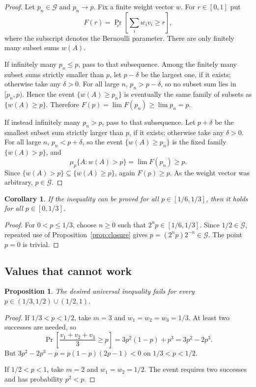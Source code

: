 \documentclass[12pt]{article}
\newtheorem{proposition}{Proposition}
\newtheorem{corollary}{Corollary}
\begin{document}
\begin{proof}
Let \(p_n\in\mathcal G\) and \(p_n\to p\).  Fix a finite weight vector \(w\).
For \(r\in[0,1]\) put
\[
        F(r)=\Pr_r\!\left[\sum_i w_i v_i\ge r\right],
\]
where the subscript denotes the Bernoulli parameter.  There are only finitely
many subset sums \(w(A)\).

If infinitely many \(p_n\le p\), pass to that subsequence.  Among the finitely
many subset sums strictly smaller than \(p\), let \(p-\delta\) be the largest
one, if it exists; otherwise take any \(\delta>0\).  For all large \(n\),
\(p_n>p-\delta\), so no subset sum lies in \([p_n,p)\).  Hence the
event \(\{w(A)\ge p_n\}\) is eventually the same family of subsets as
\(\{w(A)\ge p\}\).  Therefore \(F(p)=\lim F(p_n)\ge\lim p_n=p\).

If instead infinitely many \(p_n>p\), pass to that subsequence.  Let \(p+\delta\)
be the smallest subset sum strictly larger than \(p\), if it exists; otherwise
take any \(\delta>0\).  For all large \(n\), \(p_n<p+\delta\), so the event
\(\{w(A)\ge p_n\}\) is the fixed family \(\{w(A)>p\}\), and
\[
       \mu_p\{A:w(A)>p\}=\lim F(p_n)\ge p .
\]
Since \(\{w(A)>p\}\subseteq\{w(A)\ge p\}\), again \(F(p)\ge p\).  As the weight
vector was arbitrary, \(p\in\mathcal G\).
\end{proof}

\begin{corollary}\label{cor:base}
If the inequality can be proved for all \(p\in[1/6,1/3]\), then it holds for
all \(p\in[0,1/3]\).
\end{corollary}

\begin{proof}
For \(0<p\le1/3\), choose \(n\ge0\) such that \(2^n p\in[1/6,1/3]\).  Since
\(1/2\in\mathcal G\), repeated use of Proposition~\ref{prop:closure} gives
\(p=(2^n p)2^{-n}\in\mathcal G\).  The point \(p=0\) is trivial.
\end{proof}

\subsection*{Values that cannot work}

\begin{proposition}\label{prop:negative}
The desired universal inequality fails for every
\(p\in(1/3,1/2)\cup(1/2,1)\).
\end{proposition}

\begin{proof}
If \(1/3<p<1/2\), take \(m=3\) and \(w_1=w_2=w_3=1/3\).  At least two
successes are needed, so
\[
\Pr\!\left[\frac{v_1+v_2+v_3}{3}\ge p\right]
  =3p^2(1-p)+p^3
  =3p^2-2p^3 .
\]
But \(3p^2-2p^3-p=p(1-p)(2p-1)<0\) on \(1/3<p<1/2\).

If \(1/2<p<1\), take \(m=2\) and \(w_1=w_2=1/2\).  The event requires two
successes and has probability \(p^2<p\).
\end{proof}
\end{document}
